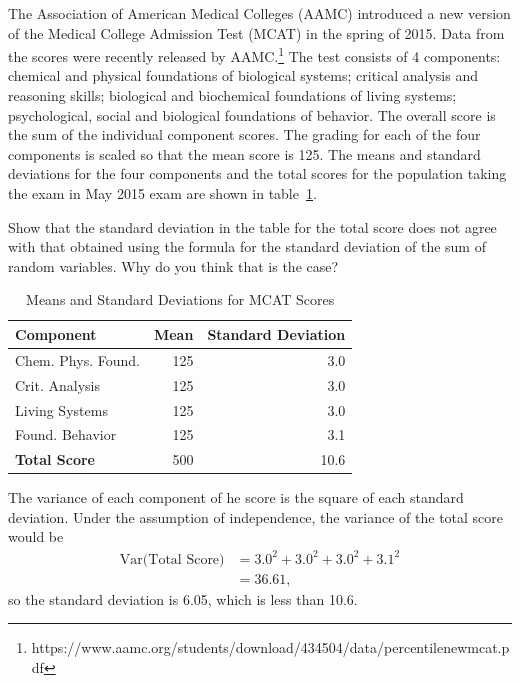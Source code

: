 \begin{exercise}  The Association of American Medical Colleges (AAMC) introduced a new version of the Medical College Admission Test (MCAT) in the spring of 2015. Data from the scores were recently released by AAMC.\footnote{https://www.aamc.org/students/download/434504/data/percentilenewmcat.pdf}  The test consists of 4 components: chemical and physical foundations of biological systems; critical analysis and reasoning skills; biological and biochemical foundations of living systems; psychological, social and biological foundations of behavior. The overall score is the sum of the individual component scores. The grading for each of the four components is scaled so that the mean score is 125.  The means and standard deviations for the four components and the total scores for the population taking the exam in May 2015 exam are shown in table~\ref{table:mcatScoreDistribution}.
	
Show that the standard deviation in the table for the total score does not agree with that obtained using the formula for the standard deviation of the sum of random variables.  Why do you think that is the case?

	\begin{table}[h]
		\centering
		\begin{tabular}{lrr}
			\hline
			\textbf{Component} & \textbf{Mean} & \textbf{Standard Deviation}\\
			\hline
			             Chem. Phys. Found. &   125 &   3.0\\
			             Crit. Analysis &   125 &    3.0 \\
			             Living  Systems &  125 &     3.0\\
			             Found. Behavior&   125 &     3.1\\
			             \textbf{Total Score} &    500 &     10.6\\
			\hline
		\end{tabular}
		\caption{Means and Standard Deviations for MCAT Scores}
		\label{table:mcatScoreDistribution}
	\end{table}	

The variance of each component of he score is the square of each standard deviation.  Under the assumption of independence, the variance of the total score would be 
\begin{align*}
	\textrm{Var(Total Score)} &= 3.0^2 + 3.0^2 + 3.0^2 + 3.1^2 \\
	    &= 36.61,
\end{align*}
so the standard deviation is 6.05, which is less than 10.6.  
\end{exercise}


